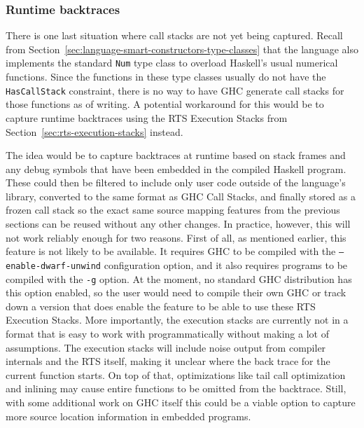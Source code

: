 \documentclass[fontsize=11pt,a4paper,parskip=half,numbers=noenddot]{scrartcl}
\newcommand{\hask}[1]{\texttt{#1}}
\begin{document}
\subsubsection{Runtime backtraces}


There is one last situation where call stacks are not yet being captured. Recall
from Section~\ref{sec:language-smart-constructors-type-classes} that the
language also implements the standard \hask{Num} type class to overload
Haskell's usual numerical functions. Since the functions in these type classes
usually do not have the \hask{HasCallStack} constraint, there is no way to have
GHC generate call stacks for those functions as of writing. A potential
workaround for this would be to capture runtime backtraces using the RTS
Execution Stacks from Section~\ref{sec:rts-execution-stacks} instead.

The idea would be to capture backtraces at runtime based on stack frames and any
debug symbols that have been embedded in the compiled Haskell program. These
could then be filtered to include only user code outside of the language's
library, converted to the same format as GHC Call Stacks, and finally stored as
a frozen call stack so the exact same source mapping features from the previous
sections can be reused without any other changes. In practice, however, this
will not work reliably enough for two reasons. First of all, as mentioned
earlier, this feature is not likely to be available. It requires GHC to be
compiled with the \texttt{--enable-dwarf-unwind} configuration option, and it
also requires programs to be compiled with the \texttt{-g} option. At the
moment, no standard GHC distribution has this option enabled, so the user would
need to compile their own GHC or track down a version that does enable the
feature to be able to use these RTS Execution Stacks. More importantly, the
execution stacks are currently not in a format that is easy to work with
programmatically without making a lot of assumptions. The execution stacks will
include noise output from compiler internals and the RTS itself, making it
unclear where the back trace for the current function starts. On top of that,
optimizations like tail call optimization and inlining may cause entire
functions to be omitted from the backtrace. Still, with some additional work on
GHC itself this could be a viable option to capture more source location
information in embedded programs.
\end{document}
